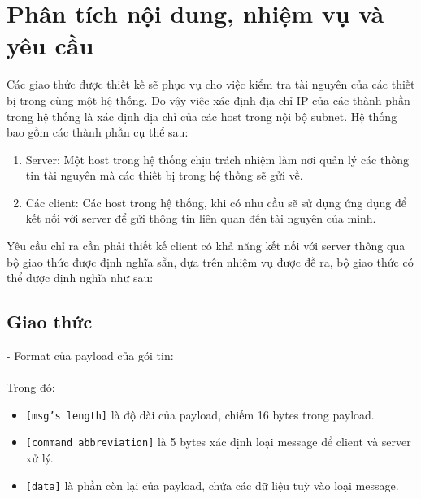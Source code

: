 \documentclass[a4paper,11pt]{extarticle}
\begin{document}
\section{Phân tích nội dung, nhiệm vụ và yêu cầu}
Các giao thức được thiết kế sẽ phục vụ cho việc kiểm tra tài nguyên của các thiết bị trong cùng một hệ thống. Do vậy việc xác định địa chỉ IP của các thành phần trong hệ thống là xác định địa chỉ của các host trong nội bộ subnet. Hệ thống bao gồm các thành phần cụ thể sau:
\begin{enumerate}[noitemsep]
    \item Server: Một host trong hệ thống chịu trách nhiệm làm nơi quản lý các thông tin tài nguyên mà các thiết bị trong hệ thống sẽ gửi về.
    \item Các client: Các host trong hệ thống, khi có nhu cầu sẽ sử dụng ứng dụng để kết nối với server để gửi thông tin liên quan đến tài nguyên của mình.
\end{enumerate}
Yêu cầu chỉ ra cần phải thiết kế client có khả năng kết nối với server thông qua bộ giao thức được định nghĩa sẵn, dựa trên nhiệm vụ được đề ra, bộ giao thức có thể được định nghĩa như sau: 
\subsection{Giao thức}
- Format của payload của gói tin: \\
 \\
Trong đó:
\begin{itemize}[noitemsep]
    \item \texttt{[msg's length]} là độ dài của payload, chiếm 16 bytes trong payload.
    \item \texttt{[command abbreviation]} là 5 bytes xác định loại message để client và server xử lý.
    \item \texttt{[data]} là phần còn lại của payload, chứa các dữ liệu tuỳ vào loại message.
\end{itemize}

    
\end{document}
